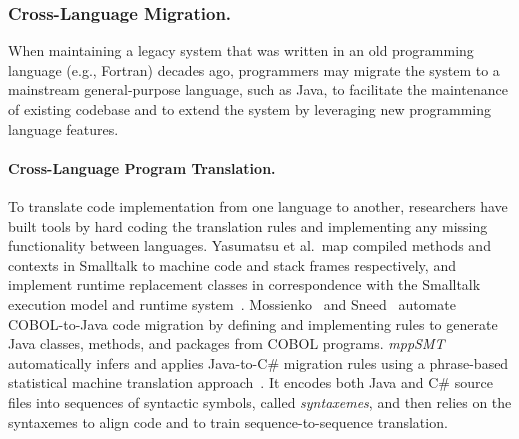 
\subsubsection{Cross-Language Migration.} 
When maintaining a legacy system that was written in an old programming language (e.g., Fortran) decades ago, programmers may migrate the system to a mainstream general-purpose language, such as Java, to facilitate the maintenance of existing codebase and to extend the system by leveraging new programming language features. 

\paragraph{{Cross-Language Program Translation.}}
To translate code implementation from one language to another, researchers have built tools by hard coding the translation rules and implementing any missing functionality between languages. %
Yasumatsu et al.~map compiled methods and contexts in Smalltalk to machine code and stack frames respectively, and implement runtime replacement classes in correspondence with the Smalltalk execution model and runtime system~\cite{Yasumatsu:95}. Mossienko~\cite{1192409:03} and Sneed~\cite{Sneed:2010} automate COBOL-to-Java code migration by defining and implementing rules to generate Java classes, methods, and packages from COBOL programs. 
{\em mppSMT} automatically infers and applies Java-to-C\# migration rules using a phrase-based statistical machine translation approach~\cite{7372046}. It encodes both Java and C\# source files into sequences of syntactic symbols, called {\em syntaxemes}, and then relies on the syntaxemes to align code and to train sequence-to-sequence translation. 

